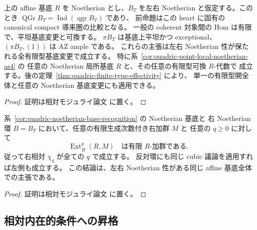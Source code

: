 \begin{corollary}
\label{cor:quadric-noetherian-base-recognition}
上の affine 基底 $R$ を Noetherian とし、$B_T$ を左右 Noetherian
と仮定する。このとき
$\operatorname{QGr}B_T=\operatorname{Ind}(\operatorname{qgr}B_T)$ であり、
前命題はこの heart に固有の canonical compact 導来圏の比較となる。
一般の coherent 対象間の Hom は有限で、平坦基底変更と可換する。
$\pi B_T$ は基底上平坦かつ exceptional、$(\pi B_T,(1))$ は AZ ample である。
これらの主張は左右 Noetherian 性が保たれる全有限型基底変更で成立する。
特に系~\ref{cor:quadric-point-local-noetherian-as4} の
任意の Noetherian 局所基底 $R$ と、その任意の有限型可換 $R$-代数で
成立する。後の定理~\ref{thm:quadric-finite-type-effectivity} により、
単一の有限型開全体と任意の Noetherian 基底変更にも適用できる。
\end{corollary}
\begin{proof}
証明は相対モジュライ論文 \cite[\texttt{relative_cubic_tails}]{QuadricModuli2026} に置く。
\end{proof}

\begin{lemma}
\label{lem:relative-cubic-global-chi}
系~\ref{cor:quadric-noetherian-base-recognition} の Noetherian 基底と
右 Noetherian 環 $B=B_T$ において、任意の有限生成次数付き右加群 $M$ と
任意の $q\ge0$ に対して
\[
   \underline{\operatorname{Ext}}^q_B(R,M)
   \quad\text{は有限 }R\text{-加群である}.
\]
従って右相対 $\chi_q$ が全ての $q$ で成立する。
反対環にも同じ cubic 議論を適用すれば左側も成立する。
この結論は、左右 Noetherian 性がある同じ affine 基底全体での主張である。
\end{lemma}
\begin{proof}
証明は相対モジュライ論文 \cite[\texttt{relative_cubic_tails}]{QuadricModuli2026} に置く。
\end{proof}

\subsection{相対内在的条件への昇格}

